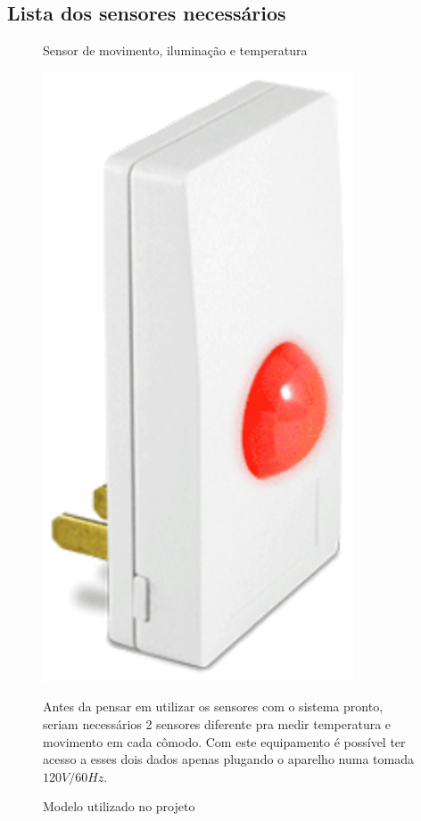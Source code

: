 \subsection{Lista dos sensores necessários}
\begin{enumerate}
	\begin{figure}[h]
	\item Sensor de movimento, iluminação e temperatura
	  \begin{center}
		\includegraphics[keepaspectratio,angle=90]{figuras/sensor_movimento.eps}
		\caption{Modelo utilizado no projeto}
	  \end{center}

	Antes da pensar em utilizar os sensores com o sistema pronto, seriam necessários 2 sensores diferente pra medir temperatura e movimento em cada cômodo. Com este equipamento é possível ter acesso a esses dois dados apenas plugando o aparelho numa tomada $120V/60Hz$.


\end{figure}
\end{enumerate}

